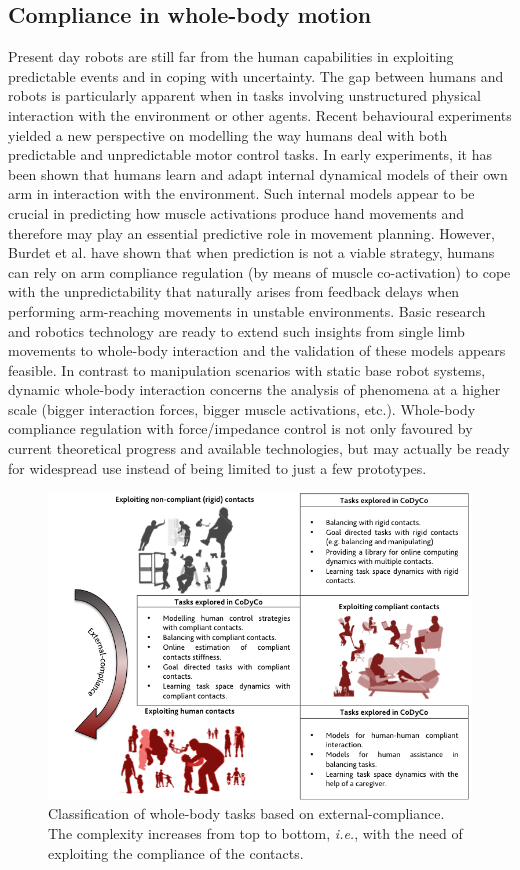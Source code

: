 \documentclass[final,5p,twocolumn]{elsarticle}
\begin{document}
\subsection {Compliance in whole-body motion}

Present day robots are still far from the human capabilities in exploiting predictable events and in coping with uncertainty. The gap between humans and robots is particularly apparent when in tasks involving unstructured physical interaction with the environment or other agents. Recent behavioural experiments yielded a new perspective on modelling the way humans deal with both predictable and unpredictable motor control tasks. In early experiments, it has been shown \cite{Shadmehr1994a} that humans learn and adapt internal dynamical models of their own arm in interaction with the environment. Such internal models appear to be crucial in predicting how muscle activations produce hand movements and therefore may play an essential predictive role in movement planning. However, Burdet et al. \cite{Burdet2001} have shown that when prediction is not a viable strategy, humans can rely on arm compliance regulation (by means of muscle co-activation) to cope with the unpredictability that naturally arises from feedback delays when performing arm-reaching movements in unstable environments. Basic research and robotics technology are ready to extend such insights from single limb movements to whole-body interaction and the validation of these models appears feasible. In contrast to manipulation scenarios with static base robot systems, dynamic whole-body interaction concerns the analysis of phenomena at a higher scale (bigger interaction forces, bigger muscle activations, etc.).  Whole-body compliance regulation with force/impedance control is not only favoured by current theoretical progress and available technologies, but may actually be ready for widespread use instead of being limited to just a few prototypes.

\begin{figure}
\centering
\includegraphics[width=\linewidth]{./images/classification1.png}
\caption{Classification of whole-body tasks based on external-compliance. The complexity increases from top to bottom, \textit{i.e.}, with the need of exploiting the compliance of the contacts.}
\label{fig:classification1}
\end{figure}
\end{document}
